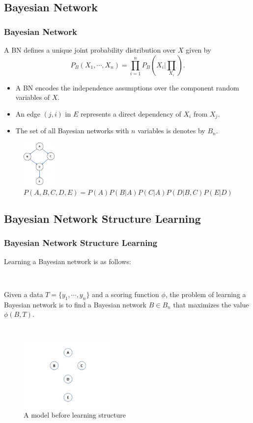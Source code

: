 \documentclass{beamer}
\begin{document}
\subsection{Bayesian Network}
\begin{frame}
\frametitle{Bayesian Network}
{\scriptsize{}
A BN defines a unique joint probability distribution over $X$ given by
$$P_{B}(X_{1},\cdots,X_{n})=\prod_{i=1}^{n}P_{B}(X_{i}|\prod_{X_{i}}).$$

\begin{itemize}
	\item A BN encodes the independence assumptions over the component random variables of $X$.
	
	\item An edge $(j, i)$ in $E$ represents a direct dependency of $X_{i}$ from $X_{j}$.
	
	\item The set of all Bayesian networks with $n$ variables is denotes by $B_{n}$.
\end{itemize}

\begin{figure}[!h]
	\centering
		\includegraphics[height=65pt]{images/image01}
		\caption{{\scriptsize{}$P(A,B,C,D,E)=P(A)P(B|A)P(C|A)P(D|B,C)P(E|D)$}}
\end{figure}	
}
\end{frame}

\subsection{Bayesian Network Structure Learning}
\begin{frame}
\frametitle{Bayesian Network Structure Learning}
{\scriptsize{}

Learning a Bayesian network is as follows:

{}\

Given a data $T = \{y_{1}, \cdots, y_{n}\}$ and a scoring function $\phi$, the problem of learning a Bayesian network is to find a Bayesian network $B \in B_{n}$ that maximizes the value $\phi(B, T)$.

{}\

\begin{figure}[!h]
	\centering
		\includegraphics[height=100pt]{images/image02}
		\caption{{\scriptsize{}A model before learning structure}}
\end{figure}	
}
\end{frame}
\end{document}
